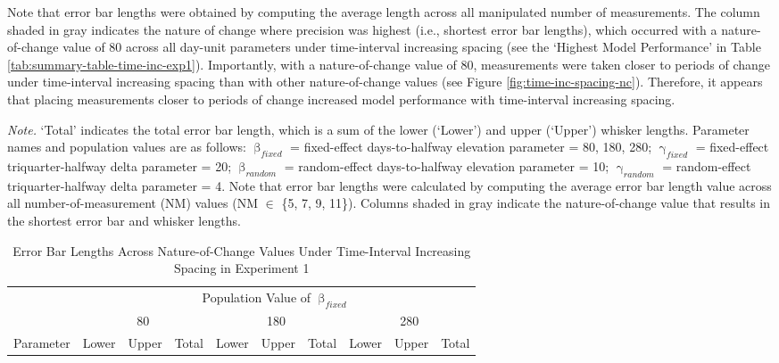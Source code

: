 \documentclass[
12pt, %
twoside,
english]{guelphthesis}
\begin{document}
\noindent Note that error bar lengths were obtained by computing the average length across all manipulated number of measurements. The column shaded in gray indicates the nature of change where precision was highest (i.e., shortest error bar lengths), which occurred with a nature-of-change value of 80 across all day-unit parameters under time-interval increasing spacing (see the `Highest Model Performance' in Table \ref{tab:summary-table-time-inc-exp1}). Importantly, with a nature-of-change value of 80, measurements were taken closer to periods of change under time-interval increasing spacing than with other nature-of-change values (see Figure \ref{fig:time-inc-spacing-nc}). Therefore, it appears that placing measurements closer to periods of change increased model performance with time-interval increasing spacing.
\begin{ThreePartTable}
\begin{TableNotes}
\item \textit{Note. }`Total' indicates the total error bar length, which is a sum of the lower (`Lower') and upper (`Upper') whisker lengths. Parameter names and population values are as follows: $\upbeta_{fixed}$ = fixed-effect days-to-halfway elevation parameter = {80, 180, 280}; $\upgamma_{fixed}$ = fixed-effect triquarter-halfway delta parameter = 20; $\upbeta_{random}$ = random-effect days-to-halfway elevation parameter = 10; $\upgamma_{random}$ = random-effect triquarter-halfway delta parameter = 4. Note that error bar lengths were calculated by computing the average error bar length value across all number-of-measurement (NM) values (NM $\in$ \{5, 7, 9, 11\}). Columns shaded in gray indicate the nature-of-change value that results in the shortest error bar and whisker lengths.
\end{TableNotes}
\begin{longtable}[l]{>{\raggedright\arraybackslash}p{3cm}>{}c>{}c>{}ccccccc}
\caption{\label{tab:errorbar-time-inc-nc}Error Bar Lengths Across Nature-of-Change Values Under Time-Interval Increasing Spacing in Experiment 1}\\
\toprule
\multicolumn{1}{c}{ } & \multicolumn{9}{c}{Population Value of $\upbeta_{fixed}$} \\
\cmidrule(l{3pt}r{3pt}){2-10}
\multicolumn{1}{c}{ } & \multicolumn{3}{c}{80} & \multicolumn{3}{c}{180} & \multicolumn{3}{c}{280} \\
\cmidrule(l{3pt}r{3pt}){2-4} \cmidrule(l{3pt}r{3pt}){5-7} \cmidrule(l{3pt}r{3pt}){8-10}
Parameter & Lower & Upper & Total & Lower & Upper & Total & Lower & Upper & Total\\

\end{longtable}
\end{ThreePartTable}
\end{document}
